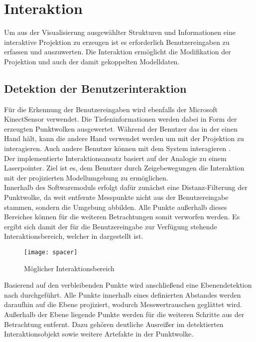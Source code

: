 \chapter{Interaktion}
Um aus der Visualisierung ausgewählter Strukturen und Informationen eine interaktive Projektion zu erzeugen ist es erforderlich Benutzereingaben zu erfassen und auszuwerten. Die Interaktion ermöglicht die Modifikation der Projektion und auch der damit gekoppelten Modelldaten.

\section{Detektion der Benutzerinteraktion}
Für die Erkennung der Benutzereingaben wird ebenfalls der Microsoft Kinect\red[TM] Sensor verwendet. Die Tiefeninformationen werden dabei in Form der erzeugten Punktwolken ausgewertet. Während der Benutzer das \kps{} in der einen Hand hält, kann die andere Hand verwendet werden um mit der Projektion zu interagieren. Auch andere Benutzer können mit dem System interagieren .\\

Der implementierte Interaktionsansatz basiert auf der Analogie zu einem Laserpointer. Ziel ist es, dem Benutzer durch Zeigebewegungen die Interaktion mit der projizierten Modellumgebung zu ermöglichen.\\
Innerhalb des Softwaremoduls \mInteraction {} erfolgt dafür zunächst eine Distanz-Filterung der Punktwolke, da weit entfernte Messpunkte nicht aus der Benutzereingabe stammen, sondern die Umgebung abbilden. Alle Punkte außerhalb dieses Bereiches können für die weiteren Betrachtungen somit verworfen werden. Es ergibt sich damit der für die Benutzereingabe zur Verfügung stehende Interaktionsbereich, welcher in  dargestellt ist.\\

\begin{figure}[!ht]
	\begin{center}
		\texttt{[image: spacer]}
		\caption{Möglicher Interaktionsbereich}
		\label{fig.intfov}
	\end{center}
\end{figure}

Basierend auf den verbleibenden Punkte wird anschließend eine Ebenendetektion nach \cite{Fischler1981} durchgeführt. Alle Punkte innerhalb eines definierten Abstandes werden daraufhin auf die \red[approximierte] Ebene projiziert, wodurch Messwertrauschen geglättet wird. Außerhalb der Ebene liegende Punkte werden für die weiteren Schritte aus der Betrachtung entfernt. Dazu gehören deutliche Ausreißer im detektierten Interaktionsobjekt sowie weitere Artefakte in der Punktwolke.\\


